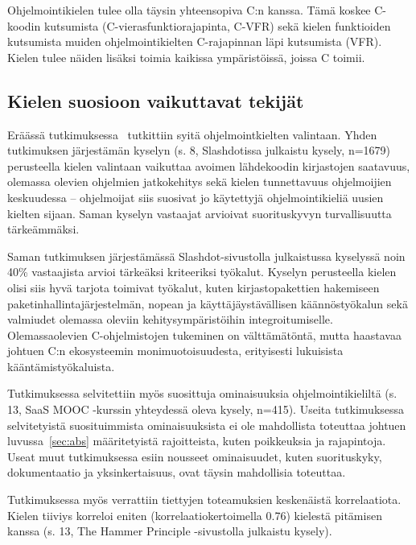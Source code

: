 Ohjelmointikielen tulee olla täysin yhteensopiva C:n kanssa. Tämä koskee
C-koodin kutsumista (C\hyp{}vierasfunktiorajapinta, C-VFR) sekä kielen funktioiden kutsumista muiden
ohjelmointikielten C-rajapinnan läpi kutsumista (VFR). Kielen tulee näiden
lisäksi toimia kaikissa ympäristöissä, joissa C toimii.

\subsection{Kielen suosioon vaikuttavat tekijät}

Eräässä tutkimuksessa~\citep{empiricalpopularity} tutkittiin syitä
ohjelmointkielten valintaan. Yhden tutkimuksen järjestämän kyselyn (s. 8,
Slashdotissa julkaistu kysely, n=1679) perusteella kielen valintaan vaikuttaa
avoimen lähdekoodin kirjastojen saatavuus, olemassa olevien ohjelmien
jatkokehitys sekä kielen tunnettavuus ohjelmoijien keskuudessa -- ohjelmoijat
siis suosivat jo käytettyjä ohjelmointikieliä uusien kielten sijaan. Saman
kyselyn vastaajat arvioivat suorituskyvyn turvallisuutta tärkeämmäksi.

Saman tutkimuksen järjestämässä Slashdot-sivustolla julkaistussa kyselyssä noin
40\% vastaajista arvioi tärkeäksi kriteeriksi työkalut. Kyselyn perusteella
kielen olisi siis hyvä tarjota toimivat työkalut, kuten kirjastopakettien
hakemiseen paketinhallintajärjestelmän, nopean ja
käyttäjäystävällisen käännöstyökalun sekä valmiudet olemassa oleviin
kehitysympäristöihin integroitumiselle. Olemassaolevien C-ohjelmistojen
tukeminen on välttämätöntä, mutta haastavaa johtuen C:n ekosysteemin
monimuotoisuudesta, erityisesti lukuisista kääntämistyökaluista.

Tutkimuksessa selvitettiin myös suosittuja ominaisuuksia ohjelmointikieliltä
(s. 13, SaaS MOOC -kurssin yhteydessä oleva kysely, n=415). Useita
tutkimuksessa selvitetyistä suosituimmista ominaisuuksista ei ole mahdollista
toteuttaa johtuen luvussa~\ref{sec:abs} määritetyistä rajoitteista, kuten
poikkeuksia ja rajapintoja. Useat muut tutkimuksessa esiin nousseet
ominaisuudet, kuten suorituskyky, dokumentaatio ja yksinkertaisuus, ovat täysin
mahdollisia toteuttaa.

Tutkimuksessa myös verrattiin tiettyjen toteamuksien keskenäistä korrelaatiota.
Kielen tiiviys korreloi eniten (korrelaatiokertoimella 0.76) kielestä pitämisen
kanssa (s. 13, The Hammer Principle -sivustolla julkaistu kysely).


